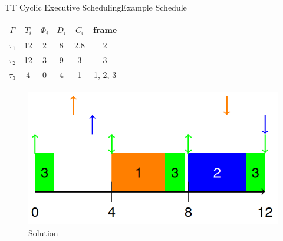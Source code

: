 \begin{frame}{TT Cyclic Executive Scheduling}{Example Schedule}
\begin{center}
    \begin{tabular}{|c||c|c|c|c|c|}
    \hline
    $\Gamma$ & $T_i$ & $\Phi_i$ & $D_i$ & $C_i$ & frame\\
    \hline
    $\tau_1$ & 12 & 2 & 8 & 2.8 & 2\\
    \hline
    $\tau_2$ & 12 & 3 & 9 & 3 & 3\\
    \hline
    $\tau_3$ & 4 & 0 & 4 & 1 & 1, 2, 3\\
    \hline
\end{tabular}
\end{center}
\begin{figure}
    \centering
    \includegraphics[scale=0.25]{figures/schedule_example.png}
    \caption{Solution}
    \label{exampleSolution}
\end{figure}
\end{frame}

